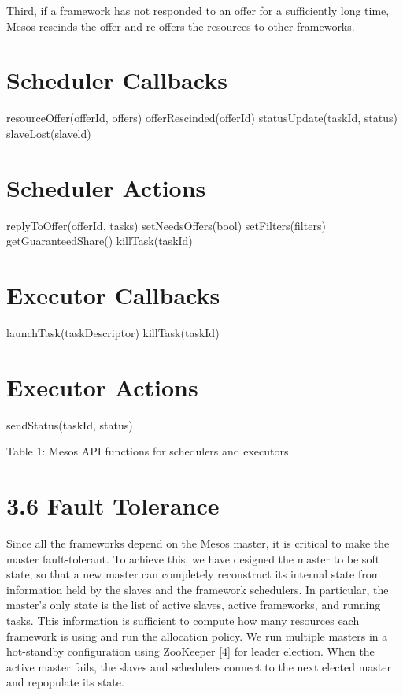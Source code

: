 \documentclass[
]{article}
\begin{document}
Third, if a framework has not responded to an offer for a sufficiently
long time, Mesos rescinds the offer and re-offers the resources to other
frameworks.

\section{Scheduler Callbacks}\label{scheduler-callbacks}

resourceOffer(offerId, offers) offerRescinded(offerId)
statusUpdate(taskId, status) slaveLost(slaveld)

\section{Scheduler Actions}\label{scheduler-actions}

replyToOffer(offerId, tasks) setNeedsOffers(bool) setFilters(filters)
getGuaranteedShare() killTask(taskId)

\section{Executor Callbacks}\label{executor-callbacks}

launchTask(taskDescriptor) killTask(taskId)

\section{Executor Actions}\label{executor-actions}

sendStatus(taskId, status)

Table 1: Mesos API functions for schedulers and executors.

\section{3.6 Fault Tolerance}\label{fault-tolerance}

Since all the frameworks depend on the Mesos master, it is critical to
make the master fault-tolerant. To achieve this, we have designed the
master to be soft state, so that a new master can completely reconstruct
its internal state from information held by the slaves and the framework
schedulers. In particular, the master's only state is the list of active
slaves, active frameworks, and running tasks. This information is
sufficient to compute how many resources each framework is using and run
the allocation policy. We run multiple masters in a hot-standby
configuration using ZooKeeper {[}4{]} for leader election. When the
active master fails, the slaves and schedulers connect to the next
elected master and repopulate its state.
\end{document}
